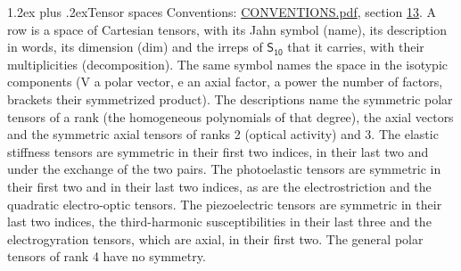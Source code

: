 \documentclass[10pt,a4paper]{article}
\makeatletter
\renewcommand\section{\@startsection{section}{1}{\z@}{-3ex plus -1ex minus -.2ex}%
  {1.2ex plus .2ex}{\normalfont\large\sffamily\bfseries\color{parttitle}}}
\numberwithin{equation}{section}
\newcommand{\grp}[1]{\mathsf{#1}}
\makeatother
\begin{document}
\section{Tensor spaces}\label{s:tensor_spaces}
Conventions: \href{../../CONVENTIONS.pdf}{CONVENTIONS.pdf}, section \href{../../CONVENTIONS.pdf\#conv.13}{13}.
\leavevmode\label{n:head.name}\label{n:head.description}\label{n:head.dim}\label{n:head.decomposition}A row is a space of Cartesian tensors, with its Jahn symbol (name), its description in words, its dimension (dim) and the irreps of $\grp{S_{10}}$ that it carries, with their multiplicities (decomposition). \label{n:label.jahn}The same symbol names the space in the isotypic components (V a polar vector, e an axial factor, a power the number of factors, brackets their symmetrized product). The descriptions name the symmetric polar tensors of a rank (the homogeneous polynomials of that degree), the axial vectors and the symmetric axial tensors of ranks 2 (optical activity) and 3. The elastic stiffness tensors are symmetric in their first two indices, in their last two and under the exchange of the two pairs. The photoelastic tensors are symmetric in their first two and in their last two indices, as are the electrostriction and the quadratic electro-optic tensors. The piezoelectric tensors are symmetric in their last two indices, the third-harmonic susceptibilities in their last three and the electrogyration tensors, which are axial, in their first two. The general polar tensors of rank 4 have no symmetry.
\end{document}
